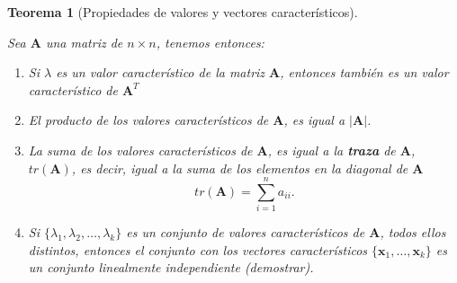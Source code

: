 \documentclass[11pt]{report}
\theoremstyle{break}
\newtheorem{teorema}{Teorema}[chapter]
\theoremstyle{break}
\newcommand{\matdim}[2]{$#1 \times #2$}
\begin{document}
\begin{teorema}[Propiedades de valores y vectores característicos]
\label{teorema:propiedades eigenvalues}

Sea $\bm{A}$ una matriz de \matdim{n}{n}, tenemos entonces:
\begin{enumerate}[label=\alph*)]
\item Si $\lambda$ es un valor característico de la matriz $\bm{A}$, entonces también es un valor característico de $\bm{A}^{T}$

\item El producto de los valores característicos de $\bm{A}$, es igual a $|\bm{A}|$.

\item La suma de los valores característicos de $\bm{A}$, es igual a la \textbf{traza} de $\bm{A}$, $tr(\bm{A})$, es decir, igual a la suma de los elementos en la diagonal de $\bm{A}$
$$ tr(\bm{A}) = \sum_{i = 1}^{n} a_{ii}.$$

\item Si $\{\lambda_{1}, \lambda_{2}, \ldots, \lambda_{k} \}$ es un conjunto de valores característicos de $\bm{A}$, todos ellos distintos, entonces el conjunto con los vectores característicos $\{\bm{x}_1, \ldots, \bm{x}_k \}$ es un conjunto linealmente independiente (demostrar). %
\end{enumerate}

\end{teorema}
\end{document}

